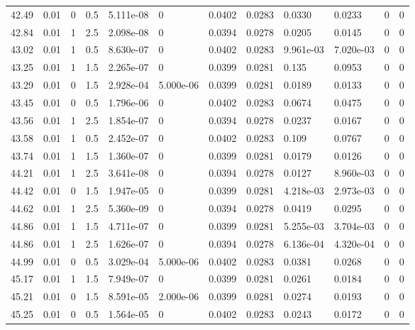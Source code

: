 \documentclass[preview]{standalone}
\begin{document}
{{{{{{\begin{tabular}{L{1.2cm}C{1.2cm} C{0.3cm}C{0.5cm} C{1.4cm}C{1.4cm} C{1.4cm}C{1.4cm} C{1.6cm}C{1.6cm} C{1.6cm}C{1.6cm}}
  42.49  &  0.01  & 0     & 0.5 &  5.111e-08  & 0  &  0.0402&   0.0283& 0.0330 & 0.0233   &  0 & 0  \\ 
  42.84  &  0.01  & 1     & 2.5 &  2.098e-08  & 0  &  0.0394&   0.0278& 0.0205 & 0.0145   &  0 & 0  \\ 
  43.02  &  0.01  & 1     & 0.5 &  8.630e-07  & 0  &  0.0402&   0.0283& 9.961e-03 & 7.020e-03   &  0 & 0  \\ 
  43.25  &  0.01  & 1     & 1.5 &  2.265e-07  & 0  &  0.0399&   0.0281& 0.135 & 0.0953   &  0 & 0  \\ 
  43.29  &  0.01  & 0     & 1.5 &  2.928e-04  & 5.000e-06  &  0.0399&   0.0281& 0.0189 & 0.0133   &  0 & 0  \\ 
  43.45  &  0.01  & 0     & 0.5 &  1.796e-06  & 0  &  0.0402&   0.0283& 0.0674 & 0.0475   &  0 & 0  \\ 
  43.56  &  0.01  & 1     & 2.5 &  1.854e-07  & 0  &  0.0394&   0.0278& 0.0237 & 0.0167   &  0 & 0  \\ 
  43.58  &  0.01  & 1     & 0.5 &  2.452e-07  & 0  &  0.0402&   0.0283& 0.109 & 0.0767   &  0 & 0  \\ 
  43.74  &  0.01  & 1     & 1.5 &  1.360e-07  & 0  &  0.0399&   0.0281& 0.0179 & 0.0126   &  0 & 0  \\ 
  44.21  &  0.01  & 1     & 2.5 &  3.641e-08  & 0  &  0.0394&   0.0278& 0.0127 & 8.960e-03   &  0 & 0  \\ 
  44.42  &  0.01  & 0     & 1.5 &  1.947e-05  & 0  &  0.0399&   0.0281& 4.218e-03 & 2.973e-03   &  0 & 0  \\ 
  44.62  &  0.01  & 1     & 2.5 &  5.360e-09  & 0  &  0.0394&   0.0278& 0.0419 & 0.0295   &  0 & 0  \\ 
  44.86  &  0.01  & 1     & 1.5 &  4.711e-07  & 0  &  0.0399&   0.0281& 5.255e-03 & 3.704e-03   &  0 & 0  \\ 
  44.86  &  0.01  & 1     & 2.5 &  1.626e-07  & 0  &  0.0394&   0.0278& 6.136e-04 & 4.320e-04   &  0 & 0  \\ 
  44.99  &  0.01  & 0     & 0.5 &  3.029e-04  & 5.000e-06  &  0.0402&   0.0283& 0.0381 & 0.0268   &  0 & 0  \\ 
  45.17  &  0.01  & 1     & 1.5 &  7.949e-07  & 0  &  0.0399&   0.0281& 0.0261 & 0.0184   &  0 & 0  \\ 
  45.21  &  0.01  & 0     & 1.5 &  8.591e-05  & 2.000e-06  &  0.0399&   0.0281& 0.0274 & 0.0193   &  0 & 0  \\ 
  45.25  &  0.01  & 0     & 0.5 &  1.564e-05  & 0  &  0.0402&   0.0283& 0.0243 & 0.0172   &  0 & 0  \\ 

\end{tabular}}}}}}}
\end{document}
